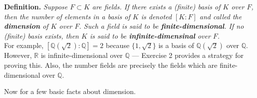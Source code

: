 \documentclass[leqno]{book}
\begin{document}
\noindent\textbf{Definition.} \emph{Suppose $F\subset K$ are fields.  If there exists a (finite) basis of $K$ over $F$, then the number of elements in a basis of $K$ is denoted $[K:F]$ and called the \textbf{dimension} of $K$ over $F$.  Such a field is said to be \textbf{finite-dimensional}.  If no (finite) basis exists, then $K$ is said to be \textbf{infinite-dimensinal} over $F$.}\\

\noindent For example, $[\mathbb Q(\sqrt 2):\mathbb Q]=2$ because $\{1,\sqrt 2\}$ is a basis of $\mathbb Q(\sqrt 2)$ over $\mathbb Q$.  However, $\mathbb R$ is infinite-dimensional over $\mathbb Q$ \---- Exercise 2 provides a strategy for proving this.  Also, the number fields are precisely the fields which are finite-dimensional over $\mathbb Q$.

Now for a few basic facts about dimension.\\
\end{document}
